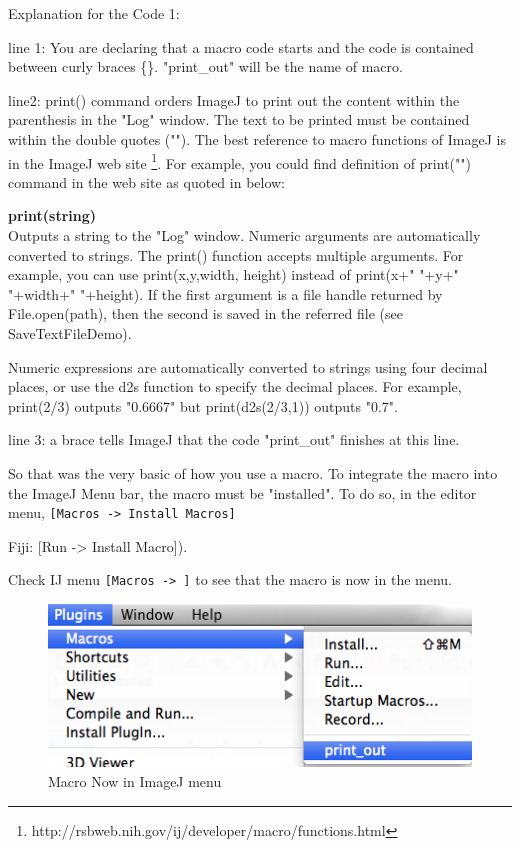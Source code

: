 \documentclass[11pt,a4paper,oneside]{report}
\newenvironment{indentFiji}%
{\begin{list}{}%
         {\setlength{\leftmargin}{1em}}%
         \item[]%
}
{\end{list}}
\newenvironment{indentCom}%
{\begin{list}{}%
         {\setlength{\leftmargin}{1em}}%
         \item[]%
}
{\end{list}}
\newcommand{\ijmenu}[1]{\texttt{\small#1}}
\begin{document}
Explanation for the Code 1:\\
\begin{itemize}
\item line 1: You are declaring that a macro code starts and the code is contained between 
curly braces \{\}. "print\_out" will be the name of macro. 

\item line2: print() command orders ImageJ to print out the content within the parenthesis 
in the "Log" window. The text to be printed must be contained within the double quotes (""). 
The best reference to macro functions of ImageJ is in the ImageJ web site
\footnote{ http://rsbweb.nih.gov/ij/developer/macro/functions.html}. 
For example, you could find definition of print("") command in the web site as quoted in below:\\
\begin{indentCom}
\textbf{print(string)}\\
Outputs a string to the "Log" window. Numeric arguments are automatically converted to strings. 
The print() function accepts multiple arguments. For example, you can use print(x,y,width, height) 
instead of print(x+" "+y+" "+width+" "+height). 
If the first argument is a file handle returned by File.open(path), 
then the second is saved in the referred file (see SaveTextFileDemo).

Numeric expressions are automatically converted to strings using four decimal places, 
or use the d2s function to specify the decimal places. 
For example, print(2/3) outputs "0.6667" but print(d2s(2/3,1)) outputs "0.7".
\end{indentCom}

\item line 3: a brace tells ImageJ that the code "print\_out" finishes at this line.  
\end{itemize}
So that was the very basic of how you use a macro. To integrate the macro into the ImageJ Menu bar, 
the macro must be "installed". To do so, in the editor menu, \ijmenu{[Macros -> Install Macros]} 
\begin{indentFiji}
Fiji: [Run -> Install Macro]).
\end{indentFiji}
Check IJ menu \ijmenu{[Macros -> ]} to see that the macro is now in the menu.\\

\begin{figure}[htbp]
\begin{center}
\includegraphics[scale=0.6]{fig/firstMacroInMenu.png}
\caption{Macro Now in ImageJ menu} \label{fig_MacroInMenu}
\end{center}
\end{figure}
\end{document}
